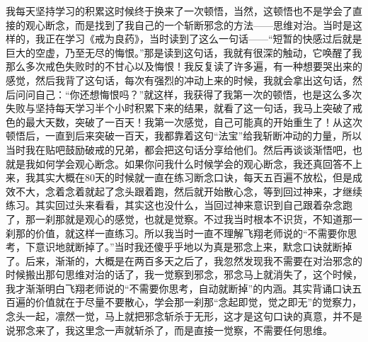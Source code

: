 \begin{case}
    我每天坚持学习的积累这时候终于换来了一次顿悟，当然，这顿悟也不是学会了直接的观心断念，而是找到了我自己的一个斩断邪念的方法——思维对治。当时是这样的，我正在学习《戒为良药》，当时读到了这么一句话——“短暂的快感过后就是巨大的空虚，乃至无尽的悔恨。”那是读到这句话，我就有很深的触动，它唤醒了我那么多次戒色失败时的不甘心以及悔恨！我反复读了许多遍，有一种想要哭出来的感觉，然后我背了这句话，每次有强烈的冲动上来的时候，我就会拿出这句话，然后问问自己：“你还想悔恨吗？”就这样，我获得了我第一次的顿悟，也是这么多次失败与坚持每天学习半个小时积累下来的结果，就看了这一句话，我马上突破了戒色的最大天数，突破了一百天！我第一次感觉，自己可能真的开始重生了！从这次顿悟后，一直到后来突破一百天，我都靠着这句“法宝”给我斩断冲动的力量，所以当时我在贴吧鼓励破戒的兄弟，都会把这句话分享给他们。然后再谈谈渐悟吧，也就是我如何学会观心断念。如果你问我什么时候学会的观心断念，我还真回答不上来，我其实大概在80天的时候就一直在练习断念口诀，每天五百遍不放松，但是成效不大，念着念着就起了念头跟着跑，然后就开始散心念，等到回过神来，才继续练习。其实回过头来看看，其实这也没什么，当回过神来意识到自己跟着杂念跑了，那一刹那就是观心的感觉，也就是觉察。不过我当时根本不识货，不知道那一刹那的价值，就这样一直练习。所以我当时一直不理解飞翔老师说的“不需要你思考，下意识地就断掉了。”当时我还傻乎乎地以为真是邪念上来，默念口诀就断掉了。后来，渐渐的，大概是在两百多天之后了，我忽然发现我不需要在对治邪念的时候搬出那句思维对治的话了，我一觉察到邪念，邪念马上就消失了，这个时候，我才渐渐明白飞翔老师说的“不需要你思考，自动就断掉”的内涵。其实背诵口诀五百遍的价值就在于尽量不要散心，学会那一刹那“念起即觉，觉之即无”的觉察力，念头一起，凛然一觉，马上就把邪念斩杀于无形，这才是这句口诀的真意，并不是说邪念来了，我这里念一声就斩杀了，而是直接一觉察，不需要任何思维。


\end{case}

